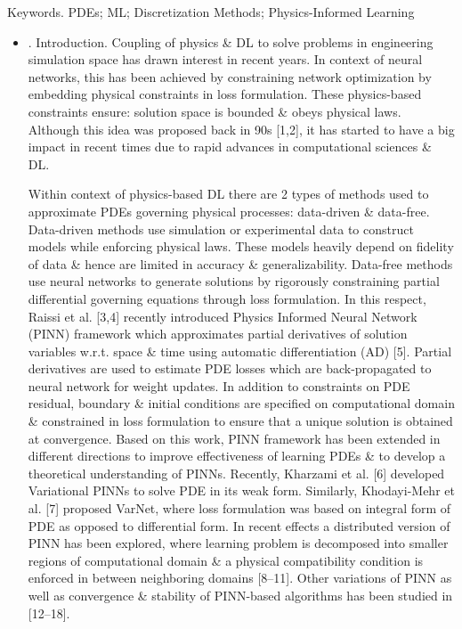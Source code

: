 \documentclass{article}
\begin{document}
{\sf Keywords.} PDEs; ML; Discretization Methods; Physics-Informed Learning
\begin{itemize}
	\item {. Introduction.} Coupling of physics \& DL to solve problems in engineering simulation space has drawn interest in recent years. In context of neural networks, this has been achieved by constraining network optimization by embedding physical constraints in loss formulation. These physics-based constraints ensure: solution space is bounded \& obeys physical laws. Although this idea was proposed back in 90s [1,2], it has started to have a big impact in recent times due to rapid advances in computational sciences \& DL.
	
	Within context of physics-based DL there are 2 types of methods used to approximate PDEs governing physical processes: data-driven \& data-free. Data-driven methods use simulation or experimental data to construct models while enforcing physical laws. These models heavily depend on fidelity of data \& hence are limited in accuracy \& generalizability. Data-free methods use neural networks to generate solutions by rigorously constraining partial differential governing equations through loss formulation. In this respect, Raissi et al. [3,4] recently introduced Physics Informed Neural Network (PINN) framework which approximates partial derivatives of solution variables w.r.t. space \& time using automatic differentiation (AD) [5]. Partial derivatives are used to estimate PDE losses which are back-propagated to neural network for weight updates. In addition to constraints on PDE residual, boundary \& initial conditions are specified on computational domain \& constrained in loss formulation to ensure that a unique solution is obtained at convergence. Based on this work, PINN framework has been extended in different directions to improve effectiveness of learning PDEs \& to develop a theoretical understanding of PINNs. Recently, Kharzami et al. [6] developed Variational PINNs to solve PDE in its weak form. Similarly, Khodayi-Mehr et al. [7] proposed VarNet, where loss formulation was based on integral form of PDE as opposed to differential form. In recent effects a distributed version of PINN has been explored, where learning problem is decomposed into smaller regions of computational domain \& a physical compatibility condition is enforced in between neighboring domains [8--11]. Other variations of PINN as well as convergence \& stability of PINN-based algorithms has been studied in [12--18].
	

\end{itemize}
\end{document}
